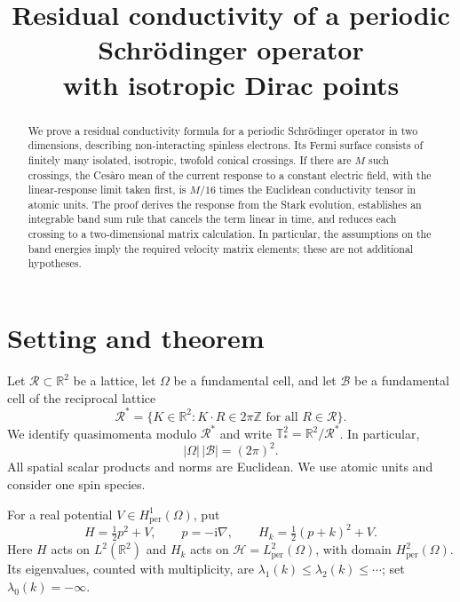 \documentclass[11pt,a4paper]{article}
\title{Residual conductivity of a periodic Schr\"odinger operator\\
with isotropic Dirac points}
\author{}
\date{}
\numberwithin{equation}{section}
\newcommand{\R}{\mathbb R}
\newcommand{\Z}{\mathbb Z}
\newcommand{\T}{\mathbb T}
\newcommand{\cR}{\mathcal R}
\newcommand{\cB}{\mathcal B}
\newcommand{\cH}{\mathcal H}
\newcommand{\ii}{\mathrm i}
\theoremstyle{remark}
\begin{document}
\maketitle

\begin{abstract}
We prove a residual conductivity formula for a periodic Schr\"odinger
operator in two dimensions, describing non-interacting spinless electrons.
Its Fermi surface consists
of finitely many isolated, isotropic, twofold conical crossings. If there
are $M$ such crossings, the Ces\`aro mean of the current response to a
constant electric field, with the linear-response limit taken first, is
$M/16$ times the Euclidean conductivity tensor in atomic units.
The proof derives the response from the Stark evolution, establishes an
integrable band sum rule that cancels the term linear in time, and reduces
each crossing to a two-dimensional matrix calculation. In particular,
the assumptions on the band energies imply the required velocity matrix
elements; these are not additional hypotheses.
\end{abstract}

\section{Setting and theorem}

Let $\cR\subset\R^2$ be a lattice, let $\Omega$ be a fundamental cell, and
let $\cB$ be a fundamental cell of the reciprocal lattice
\[
 \cR^*=\{K\in\R^2:K\cdot R\in2\pi\Z\text{ for all }R\in\cR\}.
\]
We identify quasimomenta modulo $\cR^*$ and write
$\T_*^2=\R^2/\cR^*$. In particular,
\begin{equation}\label{eq:volumes}
 |\Omega|\,|\cB|=(2\pi)^2.
\end{equation}
All spatial scalar products and norms are Euclidean. We use atomic units
and consider one spin species.

For a real potential $V\in H^1_{\mathrm{per}}(\Omega)$, put
\begin{equation}\label{eq:hamiltonians}
 H=\tfrac12p^2+V,\qquad p=-\ii\nabla,
 \qquad H_k=\tfrac12(p+k)^2+V.
\end{equation}
Here $H$ acts on $L^2(\R^2)$ and $H_k$ acts on
$\cH=L^2_{\mathrm{per}}(\Omega)$, with domain
$H^2_{\mathrm{per}}(\Omega)$. Its eigenvalues, counted with multiplicity,
are $\lambda_1(k)\leq\lambda_2(k)\leq\cdots$; set
$\lambda_0(k)=-\infty$.
\end{document}
